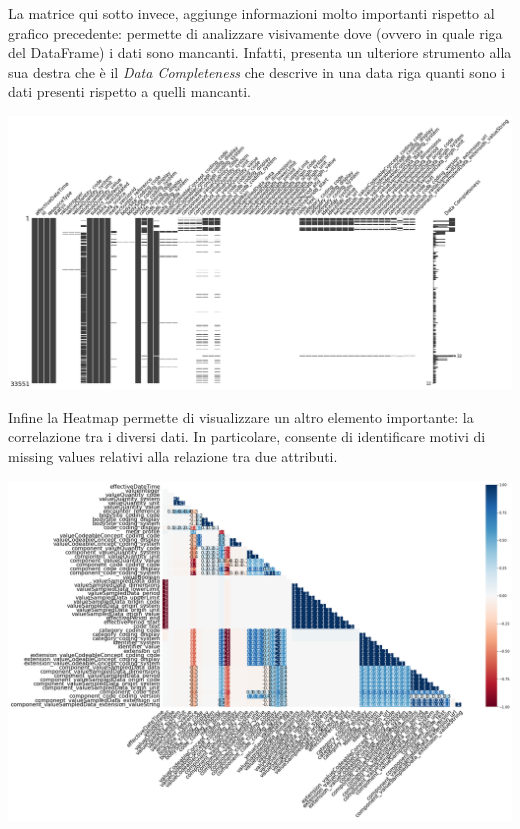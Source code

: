 \documentclass[11pt, oneside]{article}
\begin{document}
La matrice qui sotto invece, aggiunge informazioni molto importanti rispetto al grafico precedente: permette di analizzare visivamente dove (ovvero in quale riga del DataFrame) i dati sono mancanti. Infatti, presenta un ulteriore strumento alla sua destra che è il \emph{Data Completeness} che descrive in una data riga quanti sono i dati presenti rispetto a quelli mancanti. 

\begin{center}
\includegraphics[scale=0.25]{2_msn_matrix.png}
\end{center}

Infine la Heatmap permette di visualizzare un altro elemento importante: la correlazione tra i diversi dati. In particolare, consente di identificare motivi di missing values relativi alla relazione tra due attributi.

\begin{center}
\includegraphics[scale=0.25]{2_msn_heatmap.png}
\end{center}
\end{document}
